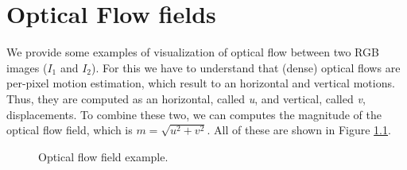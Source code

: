 \documentclass[12pt, a4paper]{report}
\begin{document}
	\chapter{Optical Flow fields}\label{appendix_c}
		We provide some examples of visualization of optical flow between two RGB images ($I_{1}$ and $I_{2}$).
		For this we have to understand that (dense) optical flows are per-pixel motion estimation, which result to an horizontal and vertical motions.
		Thus, they are computed as an horizontal, called {\itshape u}, and vertical, called {\itshape v}, displacements.
		To combine these two, we can computes the magnitude of the optical flow field, which is $m = \sqrt{u^{2} + v^{2}}$.
		All of these are shown in Figure \ref{optical_flow}.
		\begin{figure}[h!]
			\centering
			\hfill
			\vfill
			\hfill
			\vfill
			\caption{Optical flow field example.}\label{optical_flow}
		\end{figure}
\end{document}
